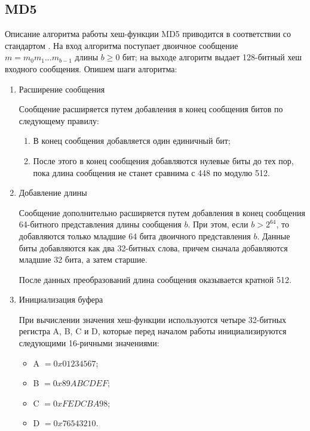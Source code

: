 \documentclass{./civarticle}
\begin{document}
\subsection{MD5}

Описание алгоритма работы хеш-функции MD5 приводится в соответствии со стандартом \cite{md5}. На вход алгоритма поступает двоичное сообщение $m = m_0m_1 ... m_{b-1}$ длины $b \geq 0$ бит; на выходе алгоритм выдает 128-битный хеш входного сообщения. Опишем шаги алгоритма:
\begin{enumerate}
    \item Расширение сообщения

    Сообщение расширяется путем добавления в конец сообщения битов по следующему правилу:

    \begin{enumerate}
        \item В конец сообщения добавляется один единичный бит;
        \item После этого в конец сообщения добавляются нулевые биты до тех пор, пока длина сообщения не станет сравнима с 448 по модулю 512.
    \end{enumerate}

    \item Добавление длины

    Сообщение дополнительно расширяется путем добавления в конец сообщения 64-битного представления длины сообщения $b$. При этом, если $b > 2^{64}$, то добавляются только младшие 64 бита двоичного представления $b$. Данные биты добавляются как два 32-битных слова, причем сначала добавляются младшие 32 бита, а затем старшие.

    После данных преобразований длина сообщения оказывается кратной 512.

    \item Инициализация буфера

    При вычислении значения хеш-функции используются четыре 32-битных регистра A, B, C и D, которые перед началом работы инициализируются следующими 16-ричными значениями:

    \begin{itemize}
        \item A $= 0x01234567$;
        \item B $= 0x89ABCDEF$;
        \item C $= 0xFEDCBA98$;
        \item D $= 0x76543210$.
    \end{itemize}


\end{enumerate}
\end{document}
